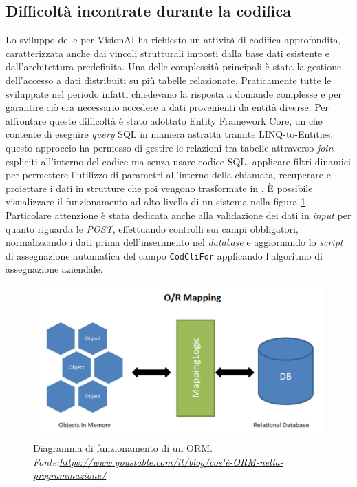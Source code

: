\subsection{Difficoltà incontrate durante la codifica}
Lo sviluppo delle  per VisionAI ha richiesto un attività di codifica approfondita, caratterizzata anche dai vincoli strutturali imposti dalla base dati esistente e dall'architettura predefinita. 
Una delle complessità principali è stata la gestione dell'accesso a dati distribuiti su più tabelle relazionate. Praticamente tutte le  sviluppate nel periodo infatti chiedevano la risposta a domande complesse e per garantire ciò era necessario accedere a dati provenienti da entità diverse. Per affrontare queste difficoltà è stato adottato Entity Framework Core, un  che contente di eseguire \textit{query} SQL in maniera astratta tramite LINQ-to-Entities, questo approccio ha permesso di gestire le relazioni tra tabelle attraverso \textit{join} espliciti all'interno del codice ma senza usare codice SQL, applicare filtri dinamici per permettere l'utilizzo di parametri all'interno della chiamata, recuperare e proiettare i dati in strutture che poi vengono trasformate in . È possibile visualizzare il funzionamento ad alto livello di un sistema  nella figura \ref{fig:ORM}.
Particolare attenzione è stata dedicata anche alla validazione dei dati in \textit{input} per quanto riguarda le  \textit{POST}, effettuando controlli sui campi obbligatori, normalizzando i dati prima dell'inserimento nel \textit{database} e aggiornando lo \textit{script} di assegnazione automatica del campo \texttt{CodCliFor} applicando l'algoritmo di assegnazione aziendale.

\begin{figure}[H]
    \centering
    \includegraphics[width=.7\columnwidth]{thesis/files/img/ORM.jpg}
    \caption[Diagramma di funzionamento di un ORM.]{
        Diagramma di funzionamento di un ORM.\\
\textit{Fonte:\url{https://www.youstable.com/it/blog/cos'è-ORM-nella-programmazione/}}
    }
    \label{fig:ORM}
\end{figure}




